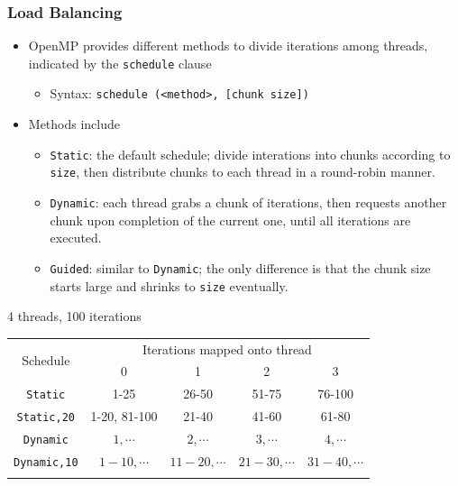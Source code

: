 \documentclass[10pt,t]{beamer}
\begin{document}
\begin{frame}[allowframebreaks]
  \frametitle{Load Balancing}
  \begin{itemize}
    \item OpenMP provides different methods to divide iterations among threads, indicated by the \texttt{schedule} clause
    \begin{itemize}
      \item Syntax: \texttt{schedule (<method>, [chunk size])}
    \end{itemize}
    \item Methods include
    \begin{itemize}
      \item \texttt{Static}: the default schedule; divide interations into chunks according to \texttt{size}, then distribute chunks to each thread in a round-robin manner.
      \item \texttt{Dynamic}: each thread grabs a chunk of iterations, then requests another chunk upon completion of the current one, until all iterations are executed.
      \item \texttt{Guided}: similar to \texttt{Dynamic}; the only difference is that the chunk size starts large and shrinks to \texttt{size} eventually.
    \end{itemize}
  \end{itemize}

  \begin{block}{4 threads, 100 iterations}
    \begin{tabular}{ccccc}
      \multirow{2}{*}{Schedule}& \multicolumn{4}{c}{Iterations mapped onto thread}\\
      & 0 & 1 & 2 & 3 \\
      \hline
      \texttt{Static} & 1-25 & 26-50 & 51-75 & 76-100 \\
      \texttt{Static,20} & 1-20, 81-100 & 21-40 & 41-60 & 61-80 \\
      \texttt{Dynamic} & $1,\cdots$ & $2,\cdots$ & $3,\cdots$ & $4,\cdots$ \\
      \texttt{Dynamic,10} & $1-10,\cdots$ & $11-20,\cdots$ & $21-30,\cdots$ & $31-40,\cdots$ \\
      \hline\\
    \end{tabular}
  \end{block}


\end{frame}
\end{document}
